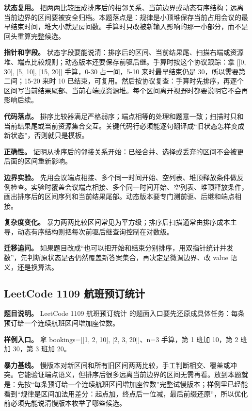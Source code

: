 \textbf{状态复用。} 把两两比较压成排序后的相邻关系、当前边界或动态有序结构；远离当前边界的区间要被安全归档。本题落点是：规律是小顶堆保存当前占用会议的最早结束时间，堆大小就是房间数。手算时只改被新输入影响的那一小部分，而不是回头重算完整候选。

\textbf{指针和字段。} 状态字段要能说清：排序后的区间、当前结果尾、扫描右端或资源堆、端点比较规则；动态版本还要保存前驱后继。手算时按这个协议跟踪：拿 [[0, 30], [5, 10], [15, 20]] 手算，0-30 占一间，5-10 来时最早结束仍是 30，所以需要第二间；15-20 来时 10 已结束，可复用。然后按协议复查：手算时先排序，再逐个区间写当前结果尾部、当前右端或资源堆。每个区间离开视野时都要说明它不会再影响后续。

\textbf{代码落点。} 排序比较器满足严格弱序；端点相等的处理和题意一致；扫描时只和当前结果尾或当前资源集合交互。关键代码行必须能逐句翻译成“旧状态怎样变成新状态”，否则就只是模板。

\textbf{正确性。} 证明从排序后的邻接关系开始：已经合并、选择或丢弃的区间不会被更后面的区间重新影响。

\textbf{边界实验。} 先用会议端点相接、多个同一时间开始、空列表、堆顶释放条件做反例检查。实验时覆盖会议端点相接、多个同一时间开始、空列表、堆顶释放条件，画出排序后的区间序列和当前结果尾部。动态版本要专门测前驱、后继和端点相接。

\textbf{复杂度变化。} 暴力两两比较区间常见为平方级；排序后扫描通常由排序成本主导，动态有序结构则把每次前驱后继查询控制在对数级。

\textbf{迁移追问。} 如果题目改成“也可以把开始和结束分别排序，用双指针统计并发数”，先判断原状态是否仍然覆盖新答案集合，再决定是微调边界、改 value 语义，还是换算法。

\subsection{LeetCode 1109 航班预订统计}

\textbf{题目说明。} LeetCode 1109 航班预订统计 的题面入口要先还原成具体任务：每条预订给一个连续航班区间增加座位数。

\textbf{样例入口。} 拿 bookings=[[1, 2, 10], [2, 3, 20]]、n=3 手算，第 1 班加 10，第 2 班加 30，第 3 班加 20。

\textbf{暴力基线。} 慢版本对新区间和所有旧区间两两比较，手工判断相交、覆盖或冲突。它能验证端点语义，但排序后很多远离当前边界的区间无需再看。放到本题就是：先按“每条预订给一个连续航班区间增加座位数”完整试慢版本；样例里已经能看到“规律是区间加法用差分：起点加，终点后一位减，最后前缀还原”，所以优化前必须先能说清慢版本枚举了哪些候选。

